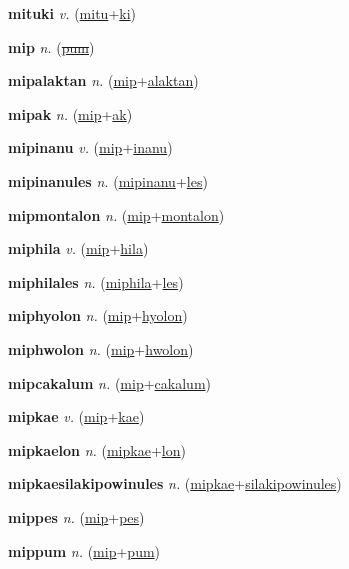 \textbf{\hypertarget{mituki}{mituki}} \textit{v.} (\hyperlink{mitu}{mitu}+\allowbreak \hyperlink{ki}{ki})


\textbf{\hypertarget{mip}{mip}} \textit{n.} (\hyperlink{pum}{\sout{pum}})


\textbf{\hypertarget{mipalaktan}{mipalaktan}} \textit{n.} (\hyperlink{mip}{mip}+\allowbreak \hyperlink{alaktan}{alaktan})


\textbf{\hypertarget{mipak}{mipak}} \textit{n.} (\hyperlink{mip}{mip}+\allowbreak \hyperlink{ak}{ak})


\textbf{\hypertarget{mipinanu}{mipinanu}} \textit{v.} (\hyperlink{mip}{mip}+\allowbreak \hyperlink{inanu}{inanu})


\textbf{\hypertarget{mipinanules}{mipinanules}} \textit{n.} (\hyperlink{mipinanu}{mipinanu}+\allowbreak \hyperlink{les}{les})


\textbf{\hypertarget{mipmontalon}{mipmontalon}} \textit{n.} (\hyperlink{mip}{mip}+\allowbreak \hyperlink{montalon}{montalon})


\textbf{\hypertarget{miphila}{miphila}} \textit{v.} (\hyperlink{mip}{mip}+\allowbreak \hyperlink{hila}{hila})


\textbf{\hypertarget{miphilales}{miphilales}} \textit{n.} (\hyperlink{miphila}{miphila}+\allowbreak \hyperlink{les}{les})


\textbf{\hypertarget{miphyolon}{miphyolon}} \textit{n.} (\hyperlink{mip}{mip}+\allowbreak \hyperlink{hyolon}{hyolon})


\textbf{\hypertarget{miphwolon}{miphwolon}} \textit{n.} (\hyperlink{mip}{mip}+\allowbreak \hyperlink{hwolon}{hwolon})


\textbf{\hypertarget{mipcakalum}{mipcakalum}} \textit{n.} (\hyperlink{mip}{mip}+\allowbreak \hyperlink{cakalum}{cakalum})


\textbf{\hypertarget{mipkae}{mipkae}} \textit{v.} (\hyperlink{mip}{mip}+\allowbreak \hyperlink{kae}{kae})


\textbf{\hypertarget{mipkaelon}{mipkaelon}} \textit{n.} (\hyperlink{mipkae}{mipkae}+\allowbreak \hyperlink{lon}{lon})


\textbf{\hypertarget{mipkaesilakipowinules}{mipkaesilakipowinules}} \textit{n.} (\hyperlink{mipkae}{mipkae}+\allowbreak \hyperlink{silakipowinules}{silakipowinules})


\textbf{\hypertarget{mippes}{mippes}} \textit{n.} (\hyperlink{mip}{mip}+\allowbreak \hyperlink{pes}{pes})


\textbf{\hypertarget{mippum}{mippum}} \textit{n.} (\hyperlink{mip}{mip}+\allowbreak \hyperlink{pum}{pum})


